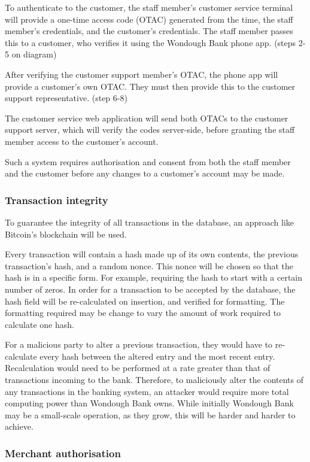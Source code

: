 To authenticate to the customer, the staff member's customer service terminal will provide a one-time access code (OTAC) generated from the time, the staff member's credentials, and the customer's credentials. The staff member passes this to a customer, who verifies it using the Wondough Bank phone app. (steps 2-5 on diagram)

After verifying the customer support member's OTAC, the phone app will provide a customer's own OTAC. They must then provide this to the customer support representative. (step 6-8)

The customer service web application will send both OTACs to the customer support server, which will verify the codes server-side, before granting the staff member access to the customer's account.

Such a system requires authorisation and consent from both the staff member and the customer before any changes to a customer's account may be made.

\subsubsection{Transaction integrity}

To guarantee the integrity of all transactions in the database, an approach like Bitcoin's blockchain \cite{blockchain} will be used.

Every transaction will contain a hash made up of its own contents, the previous transaction's hash, and a random nonce. This nonce will be chosen so that the hash is in a specific form. For example, requiring the hash to start with a certain number of zeros. In order for a transaction to be accepted by the database, the hash field will be re-calculated on insertion, and verified for formatting. The formatting required may be change to vary the amount of work required to calculate one hash.

For a malicious party to alter a previous transaction, they would have to re-calculate every hash between the altered entry and the most recent entry. Recalculation would need to be performed at a rate greater than that of transactions incoming to the bank. Therefore, to maliciously alter the contents of any transactions in the banking system, an attacker would require more total computing power than Wondough Bank owns. While initially Wondough Bank may be a small-scale operation, as they grow, this will be harder and harder to achieve.

\subsubsection{Merchant authorisation}


